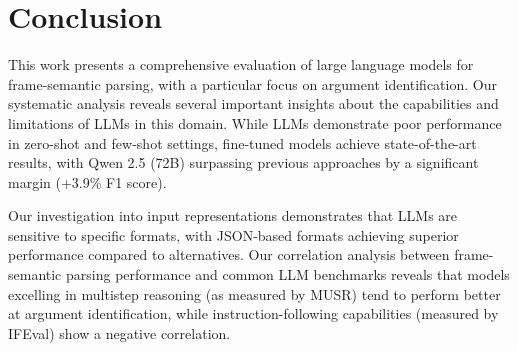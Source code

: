 \section{Conclusion}


This work presents a comprehensive evaluation of large language models for frame-semantic parsing, with a particular focus on argument identification. Our systematic analysis reveals several important insights about the capabilities and limitations of LLMs in this domain. While LLMs demonstrate poor performance in zero-shot and few-shot settings, fine-tuned models achieve state-of-the-art results, with Qwen 2.5 (72B) surpassing previous approaches by a significant margin (+3.9\% F1 score).

Our investigation into input representations demonstrates that LLMs are sensitive to specific formats, with JSON-based formats achieving superior performance compared to alternatives. Our correlation analysis between frame-semantic parsing performance and common LLM benchmarks reveals that models excelling in multistep reasoning (as measured by MUSR) tend to perform better at argument identification, while instruction-following capabilities (measured by IFEval) show a negative correlation.


